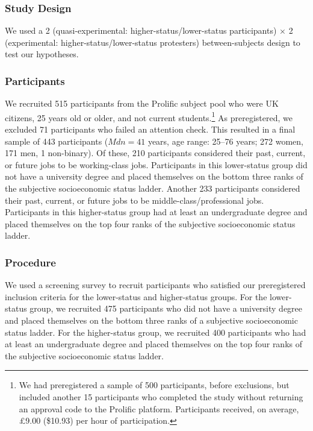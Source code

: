 \documentclass[12pt, letterpaper]{article}
\begin{document}
\hypertarget{study-design}{%
\subsubsection{Study Design}\label{study-design}}

We used a 2 (quasi-experimental: higher-status/lower-status
participants) \(\times\) 2 (experimental: higher-status/lower-status
protesters) between-subjects design to test our hypotheses.

\hypertarget{participants}{%
\subsubsection{Participants}\label{participants}}

We recruited 515 participants from the Prolific subject pool who were UK
citizens, 25 years old or older, and not current students.\footnote{We
  had preregistered a sample of 500 participants, before exclusions, but
  included another 15 participants who completed the study without
  returning an approval code to the Prolific platform. Participants
  received, on average, \pounds 9.00 (\$10.93) per hour of
  participation.} As preregistered, we excluded 71 participants who
failed an attention check. This resulted in a final sample of 443
participants (\(\textit{Mdn} = 41\) years, age range: 25--76 years; 272
women, 171 men, 1 non-binary). Of these, 210 participants considered
their past, current, or future jobs to be working-class jobs.
Participants in this lower-status group did not have a university degree
and placed themselves on the bottom three ranks of the subjective
socioeconomic status ladder. Another 233 participants considered their
past, current, or future jobs to be middle-class/professional jobs.
Participants in this higher-status group had at least an undergraduate
degree and placed themselves on the top four ranks of the subjective
socioeconomic status ladder.

\hypertarget{procedure}{%
\subsubsection{Procedure}\label{procedure}}

We used a screening survey to recruit participants who satisfied our
preregistered inclusion criteria for the lower-status and higher-status
groups. For the lower-status group, we recruited 475 participants who
did not have a university degree and placed themselves on the bottom
three ranks of a subjective socioeconomic status ladder. For the
higher-status group, we recruited 400 participants who had at least an
undergraduate degree and placed themselves on the top four ranks of the
subjective socioeconomic status ladder.
\end{document}
